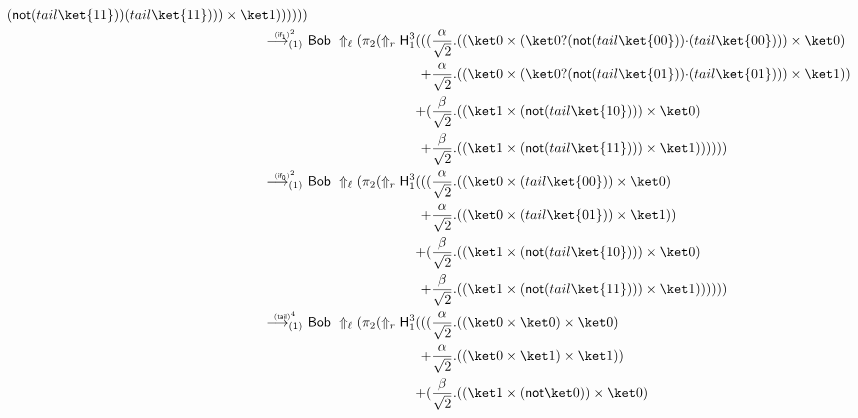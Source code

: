 \documentclass[preprint]{elsarticle}
\newcommand\lra[1][1]{\longrightarrow_{\left(#1\right)}}
\newcommand\ite[3]{{#1}?{#2}\mathord{\cdot}{#3}}
\newcommand\s[1]{\ensuremath{\mathsf{#1}}}
\newcommand\red[2][1]{\overset{\scriptscriptstyle\smash{#2}\vphantom{x}}{\lra[#1]}\ }
\newcommand\riftrue{(\s{if_{1}})}
\newcommand\riffalse{(\s{if_{0}})}
\newcommand\rtail{(\s{tail})}
\begin{document}
\begin{align*}
\begin{aligned}[t]
{                       {(\s{not}(tail \ket{11}))} {(tail \ket{11})}))
                       \times\ket 1)})))))
                   \end{aligned}
  \\
  \red{\riftrue^2} &
                     \begin{aligned}[t]
                       \s{Bob}\ \Uparrow_\ell(\pi_2(\Uparrow_r \s H_1^3( ( (
                       &    {\frac{\alpha}{\sqrt 2}.( ( \ket 0 \times ( \ite {\ket 0} {(\s{not}(tail \ket{00}))} {(tail \ket{00})})) \times\ket 0)}\\
                       +& {\frac{\alpha}{\sqrt 2}.( ( \ket 0 \times ( \ite {\ket 0} {(\s{not}(tail \ket{01}))} {(tail \ket{01})})) \times\ket 1)})\\
                       + (& {\frac{\beta}{\sqrt 2}.((\ket 1 \times (\s{not}(tail \ket{10}))) \times\ket 0)}\\
                       +& {\frac{\beta}{\sqrt 2}.((\ket 1 \times (\s{not}(tail
                         \ket{11}))) \times\ket 1)})))))
                     \end{aligned}
  \\
  \red{\riffalse^2} &
                      \begin{aligned}[t]
                        \s{Bob}\ \Uparrow_\ell(\pi_2(\Uparrow_r \s H_1^3( ((
                        &    {\frac{\alpha}{\sqrt 2}.(( \ket 0 \times (tail \ket{00})) \times\ket 0)}\\
                        +& {\frac{\alpha}{\sqrt 2}.( ( \ket 0 \times {(tail \ket{01})}) \times\ket 1)})\\
                        + (& {\frac{\beta}{\sqrt 2}.((\ket 1 \times (\s{not}(tail \ket{10}))) \times\ket 0)}\\
                        +& {\frac{\beta}{\sqrt 2}.((\ket 1 \times (\s{not}(tail
                          \ket{11}))) \times\ket 1)})))))
                      \end{aligned}
  \\
  \red{\rtail^4} &
                   \begin{aligned}[t]
                     \s{Bob}\ \Uparrow_\ell(\pi_2(\Uparrow_r \s H_1^3( ((
                     &    {\frac{\alpha}{\sqrt 2}.(( \ket 0 \times \ket 0) \times\ket 0)}\\
                     +& {\frac{\alpha}{\sqrt 2}.( ( \ket 0 \times {\ket 1}) \times\ket 1)})\\
                     + (& {\frac{\beta}{\sqrt 2}.((\ket 1 \times (\s{not}\ket 0)) \times\ket 0)}\\

\end{aligned}
\end{align*}
\end{document}
